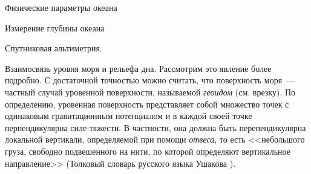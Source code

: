 \begin{chapter}{Физические параметры океана}
\begin{section}{Измерение глубины океана}
\begin{paragraph}{Спутниковая альтиметрия.}
\begin{subparagraph}{Взаимосвязь уровня моря и рельефа дна.}
Рассмотрим это явление более подробно. С достаточной точностью можно считать, 
что поверхность моря~--- частный случай уровенной поверхности, называемой
\emph{геоидом} (см. врезку). По определению, уровенная поверхность 
представляет собой множество точек с одинаковым гравитационным потенциалом
и в каждой своей точке перпендикулярна силе тяжести. 
В частности, она должна быть перепендикулярна локальной вертикали, определяемой
при помощи \emph{отвеса}, то есть <<небольшого груза, свободно подвешенного 
на нити, по которой определяют вертикальное направление>> (Толковый словарь 
русского языка Ушакова%
).
%


\end{subparagraph}
\end{paragraph}
\end{section}
\end{chapter}
